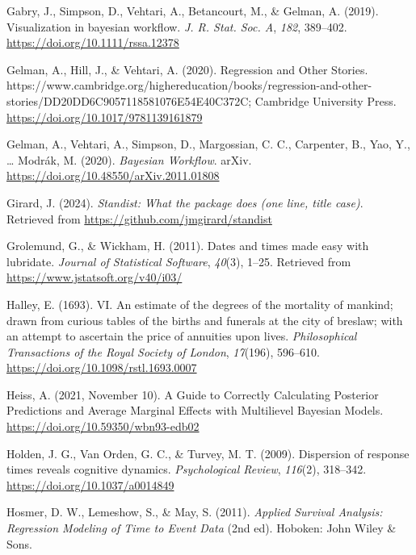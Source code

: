 \documentclass[
  man, donotrepeattitle,floatsintext]{apa6}
\newlength{\cslhangindent}
\newenvironment{CSLReferences}[2] %
 {\begin{list}{}{%
  \setlength{\itemindent}{0pt}
  \setlength{\leftmargin}{0pt}
  \setlength{\parsep}{0pt}
  \ifodd #1
   \setlength{\leftmargin}{\cslhangindent}
   \setlength{\itemindent}{-1\cslhangindent}
  \fi
  \setlength{\itemsep}{#2\baselineskip}}}
 {\end{list}}
\begin{document}
\begin{CSLReferences}{1}{0}
Gabry, J., Simpson, D., Vehtari, A., Betancourt, M., \& Gelman, A. (2019). Visualization in bayesian workflow. \emph{J. R. Stat. Soc. A}, \emph{182}, 389--402. \url{https://doi.org/10.1111/rssa.12378}

Gelman, A., Hill, J., \& Vehtari, A. (2020). Regression and {Other Stories}. https://www.cambridge.org/highereducation/books/regression-and-other-stories/DD20DD6C9057118581076E54E40C372C; Cambridge University Press. \url{https://doi.org/10.1017/9781139161879}

Gelman, A., Vehtari, A., Simpson, D., Margossian, C. C., Carpenter, B., Yao, Y., \ldots{} Modrák, M. (2020). \emph{Bayesian {Workflow}}. arXiv. \url{https://doi.org/10.48550/arXiv.2011.01808}

Girard, J. (2024). \emph{Standist: What the package does (one line, title case)}. Retrieved from \url{https://github.com/jmgirard/standist}

Grolemund, G., \& Wickham, H. (2011). Dates and times made easy with {lubridate}. \emph{Journal of Statistical Software}, \emph{40}(3), 1--25. Retrieved from \url{https://www.jstatsoft.org/v40/i03/}

Halley, E. (1693). VI. An estimate of the degrees of the mortality of mankind; drawn from curious tables of the births and funerals at the city of breslaw; with an attempt to ascertain the price of annuities upon lives. \emph{Philosophical Transactions of the Royal Society of London}, \emph{17}(196), 596--610. \url{https://doi.org/10.1098/rstl.1693.0007}

Heiss, A. (2021, November 10). A Guide to Correctly Calculating Posterior Predictions and Average Marginal Effects with Multilievel {Bayesian} Models. \url{https://doi.org/10.59350/wbn93-edb02}

Holden, J. G., Van Orden, G. C., \& Turvey, M. T. (2009). Dispersion of response times reveals cognitive dynamics. \emph{Psychological Review}, \emph{116}(2), 318--342. \url{https://doi.org/10.1037/a0014849}

Hosmer, D. W., Lemeshow, S., \& May, S. (2011). \emph{Applied {Survival Analysis}: {Regression Modeling} of {Time} to {Event Data}} (2nd ed). Hoboken: John Wiley \& Sons.


\end{CSLReferences}
\end{document}
